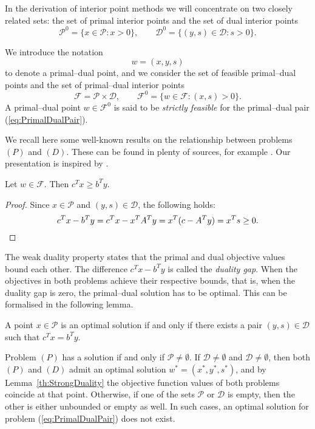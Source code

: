 In the derivation of interior point methods we will concentrate on
two closely related sets: the set of primal interior points and
the set of dual interior points 
\[
\mathcal{P}^0 = \{ x \in \mathcal{P} : x > 0 \}, \qquad
\mathcal{D}^0 = \{ (y,s) \in \mathcal{D} : s > 0 \}.
\]

We introduce the notation
\[
  w = (x,y,s)
\]
to denote a primal--dual point, and
we consider the set of feasible primal--dual points 
and the set of primal--dual interior points
\[
  \mathcal{F} = \mathcal{P} \times \mathcal{D}, \qquad
  \mathcal{F}^0 = \{ w \in \mathcal{F} : (x,s) > 0 \}.
\]
A primal--dual point $w\in\mathcal{F}^0$ is said to be {\em strictly feasible}
for the primal--dual pair (\ref{eq:PrimalDualPair}).

We recall here some well-known results on the relationship between
problems $(P)$ and $(D)$.
These can be found in plenty of sources, for example 
\cite{lp:Chvatal,Schrijver86}.
Our presentation is inspired by 
\cite{GulerRoosTerlakyVial,Megiddo,ipm:Wright97}.

\begin{lemma}
Let $w \in \mathcal{F}$. Then $c^Tx \ge b^Ty$.
\end{lemma}
%
\begin{proof}
Since $x \in \mathcal{P}$ and $(y,s) \in \mathcal{D}$, 
the following holds:
\[
  c^Tx - b^Ty = c^Tx - x^TA^Ty = x^T(c - A^T y) = x^Ts \ge 0. \qedhere
\]
\end{proof}

The weak duality property states that the primal and dual objective
values bound each other.
The difference $c^Tx - b^Ty$ is called the {\em duality gap}.
When the objectives in both problems achieve their respective bounds,
that is, when the duality gap is zero, the primal--dual solution has
to be optimal. This can be formalised
in the following lemma.

\begin{lemma}  \label{th:StrongDuality}
A point $x \in \mathcal{P}$ is an optimal solution if and only if
there exists a pair $(y,s) \in \mathcal{D}$ such that $c^Tx = b^Ty$.
\end{lemma}

Problem $(P)$ has a solution if and only if $\mathcal{P} \ne \emptyset$.
If $\mathcal{D} \ne \emptyset$ and $\mathcal{D} \ne \emptyset$,
then both $(P)$ and $(D)$ admit an
optimal solution $w^* = (x^*, y^*, s^*)$, and by Lemma~\ref{th:StrongDuality}
the objective function 
values of both problems coincide at that point. 
Otherwise, if one of the sets $\mathcal{P}$ or $\mathcal{D}$ is empty, 
then the other is either unbounded or empty as well. 
In such cases, an optimal
solution for problem (\ref{eq:PrimalDualPair}) does not exist.

